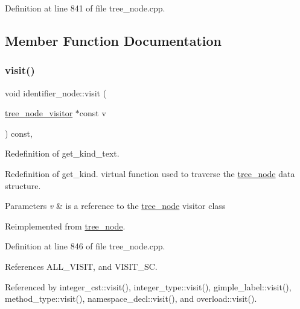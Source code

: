 Definition at line 841 of file tree\+\_\+node.\+cpp.



\subsection{Member Function Documentation}
\mbox{\label{structidentifier__node_ada49ca74d47b1db6e1dfa69a1a46d597}} 
\subsubsection{\texorpdfstring{visit()}{visit()}}
{\footnotesize\ttfamily void identifier\+\_\+node\+::visit (\begin{DoxyParamCaption}\item[{\hyperlink{classtree__node__visitor}{tree\+\_\+node\+\_\+visitor} $\ast$const}]{v }\end{DoxyParamCaption}) const\hspace{0.3cm}{\ttfamily [override]}, {\ttfamily [virtual]}}



Redefinition of get\+\_\+kind\+\_\+text. 

Redefinition of get\+\_\+kind. virtual function used to traverse the \hyperlink{classtree__node}{tree\+\_\+node} data structure. 
\begin{DoxyParams}{Parameters}
{\em v} & is a reference to the \hyperlink{classtree__node}{tree\+\_\+node} visitor class \\
\hline
\end{DoxyParams}


Reimplemented from \hyperlink{classtree__node_aa9abba3f1b30e0be80b4a56b188c6ecc}{tree\+\_\+node}.



Definition at line 846 of file tree\+\_\+node.\+cpp.



References A\+L\+L\+\_\+\+V\+I\+S\+IT, and V\+I\+S\+I\+T\+\_\+\+SC.



Referenced by integer\+\_\+cst\+::visit(), integer\+\_\+type\+::visit(), gimple\+\_\+label\+::visit(), method\+\_\+type\+::visit(), namespace\+\_\+decl\+::visit(), and overload\+::visit().

